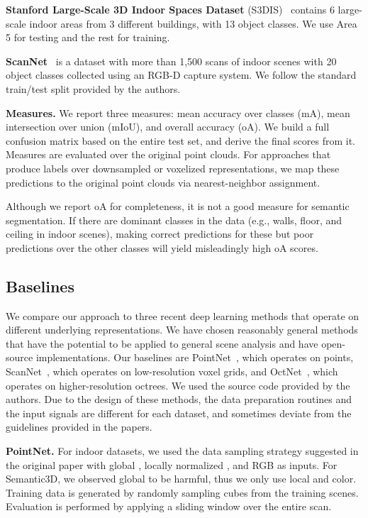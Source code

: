 \documentclass[10pt,twocolumn,letterpaper]{article}
\newcommand\mypara[1]{\vspace{1mm}\noindent\textbf{#1}}
\begin{document}
\mypara{Stanford Large-Scale 3D Indoor Spaces Dataset} (S3DIS)~\cite{armeni16} contains 6 large-scale indoor areas from 3 different buildings, with 13 object classes.
We use Area 5 for testing and the rest for training.

\mypara{ScanNet}~\cite{dai17} is a dataset with more than 1,500 scans of indoor scenes with 20 object classes collected using an \mbox{RGB-D} capture system.
We follow the standard train/test split provided by the authors.

\mypara{Measures.}
We report three measures: mean accuracy over classes (mA), mean intersection over union (mIoU), and overall accuracy (oA).
We build a full confusion matrix based on the entire test set, and derive the final scores from it.
Measures are evaluated over the original point clouds.
For approaches that produce labels over downsampled or voxelized representations, we map these predictions to the original point clouds via nearest-neighbor assignment.

Although we report oA for completeness, it is not a good measure for semantic segmentation. If there are dominant classes in the data (e.g., walls, floor, and ceiling in indoor scenes), making correct predictions for these but poor predictions over the other classes will yield misleadingly high oA scores.

\subsection{Baselines}

We compare our approach to three recent deep learning methods that operate on different underlying representations.
We have chosen reasonably general methods that have the potential to be applied to general scene analysis and have open-source implementations.
Our baselines are PointNet~\cite{qi17}, which operates on points, ScanNet~\cite{dai17}, which operates on low-resolution voxel grids, and OctNet~\cite{riegler17}, which operates on higher-resolution octrees.
We used the source code provided by the authors.
Due to the design of these methods, the data preparation routines and the input signals are different for each dataset, and sometimes deviate from the guidelines provided in the papers.

\mypara{PointNet.} For indoor datasets, we used the data sampling strategy suggested in the original paper with global , locally normalized , and RGB as inputs.
For Semantic3D, we observed global  to be harmful, thus we only use local  and color.
Training data is generated by randomly sampling  cubes from the training scenes.
Evaluation is performed by applying a sliding window over the entire scan.
\end{document}
